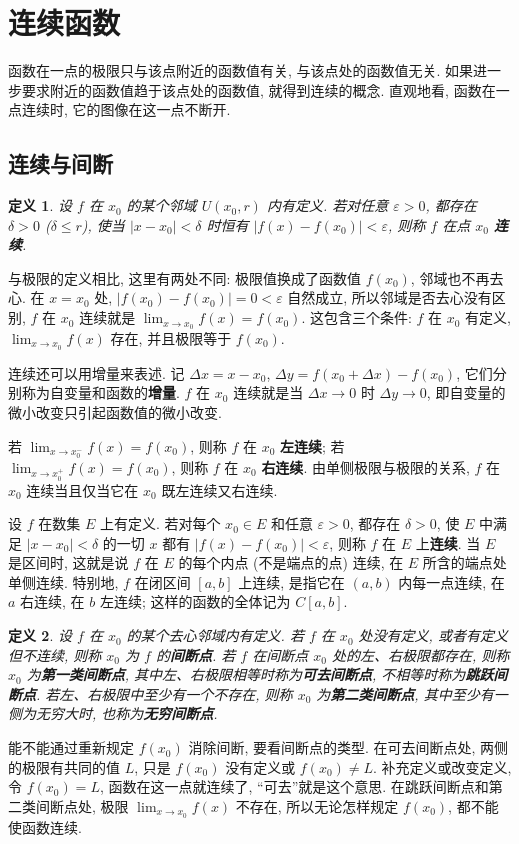 \documentclass[UTF8,openany]{ctexbook}
\theoremstyle{chinesetextbook}
\newtheorem{definition}{定义}[section]
\begin{document}
\section{连续函数}
函数在一点的极限只与该点附近的函数值有关, 与该点处的函数值无关. 如果进一步要求附近的函数值趋于该点处的函数值, 就得到连续的概念. 直观地看, 函数在一点连续时, 它的图像在这一点不断开.
\subsection{连续与间断}
\begin{definition}
设 $f$ 在 $x_0$ 的某个邻域 $U(x_0,r)$ 内有定义. 若对任意 $\varepsilon>0$, 都存在 $\delta>0$ ($\delta\le r$), 使当 $|x-x_0|<\delta$ 时恒有 $|f(x)-f(x_0)|<\varepsilon$, 则称 $f$ 在点 $x_0$ \textbf{连续}.
\end{definition}
与极限的定义相比, 这里有两处不同: 极限值换成了函数值 $f(x_0)$, 邻域也不再去心. 在 $x=x_0$ 处, $|f(x_0)-f(x_0)|=0<\varepsilon$ 自然成立, 所以邻域是否去心没有区别, $f$ 在 $x_0$ 连续就是 $\displaystyle\lim_{x\to x_0}f(x)=f(x_0)$. 这包含三个条件: $f$ 在 $x_0$ 有定义, $\displaystyle\lim_{x\to x_0}f(x)$ 存在, 并且极限等于 $f(x_0)$.

连续还可以用增量来表述. 记 $\Delta x=x-x_0$, $\Delta y=f(x_0+\Delta x)-f(x_0)$, 它们分别称为自变量和函数的\textbf{增量}. $f$ 在 $x_0$ 连续就是当 $\Delta x\to0$ 时 $\Delta y\to0$, 即自变量的微小改变只引起函数值的微小改变.

若 $\displaystyle\lim_{x\to x_0^-}f(x)=f(x_0)$, 则称 $f$ 在 $x_0$ \textbf{左连续}; 若 $\displaystyle\lim_{x\to x_0^+}f(x)=f(x_0)$, 则称 $f$ 在 $x_0$ \textbf{右连续}. 由单侧极限与极限的关系, $f$ 在 $x_0$ 连续当且仅当它在 $x_0$ 既左连续又右连续.

设 $f$ 在数集 $E$ 上有定义. 若对每个 $x_0\in E$ 和任意 $\varepsilon>0$, 都存在 $\delta>0$, 使 $E$ 中满足 $|x-x_0|<\delta$ 的一切 $x$ 都有 $|f(x)-f(x_0)|<\varepsilon$, 则称 $f$ 在 $E$ 上\textbf{连续}. 当 $E$ 是区间时, 这就是说 $f$ 在 $E$ 的每个内点 (不是端点的点) 连续, 在 $E$ 所含的端点处单侧连续. 特别地, $f$ 在闭区间 $[a,b]$ 上连续, 是指它在 $(a,b)$ 内每一点连续, 在 $a$ 右连续, 在 $b$ 左连续; 这样的函数的全体记为 $C[a,b]$.
\begin{definition}
设 $f$ 在 $x_0$ 的某个去心邻域内有定义. 若 $f$ 在 $x_0$ 处没有定义, 或者有定义但不连续, 则称 $x_0$ 为 $f$ 的\textbf{间断点}. 若 $f$ 在间断点 $x_0$ 处的左、右极限都存在, 则称 $x_0$ 为\textbf{第一类间断点}, 其中左、右极限相等时称为\textbf{可去间断点}, 不相等时称为\textbf{跳跃间断点}. 若左、右极限中至少有一个不存在, 则称 $x_0$ 为\textbf{第二类间断点}, 其中至少有一侧为无穷大时, 也称为\textbf{无穷间断点}.
\end{definition}
能不能通过重新规定 $f(x_0)$ 消除间断, 要看间断点的类型. 在可去间断点处, 两侧的极限有共同的值 $L$, 只是 $f(x_0)$ 没有定义或 $f(x_0)\ne L$. 补充定义或改变定义, 令 $f(x_0)=L$, 函数在这一点就连续了, “可去”就是这个意思. 在跳跃间断点和第二类间断点处, 极限 $\displaystyle\lim_{x\to x_0}f(x)$ 不存在, 所以无论怎样规定 $f(x_0)$, 都不能使函数连续.
\end{document}
